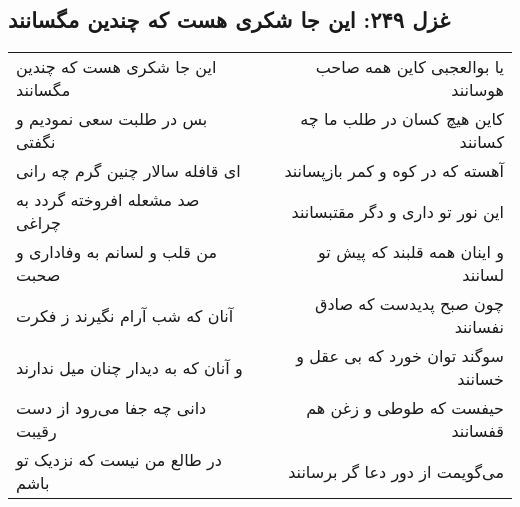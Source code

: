 \begin{center}
\section*{غزل ۲۴۹: این جا شکری هست که چندین مگسانند}
\label{sec:249}
\begin{longtable}{l p{0.5cm} r}
این جا شکری هست که چندین مگسانند
&&
یا بوالعجبی کاین همه صاحب هوسانند
\\
بس در طلبت سعی نمودیم و نگفتی
&&
کاین هیچ کسان در طلب ما چه کسانند
\\
ای قافله سالار چنین گرم چه رانی
&&
آهسته که در کوه و کمر بازپسانند
\\
صد مشعله افروخته گردد به چراغی
&&
این نور تو داری و دگر مقتبسانند
\\
من قلب و لسانم به وفاداری و صحبت
&&
و اینان همه قلبند که پیش تو لسانند
\\
آنان که شب آرام نگیرند ز فکرت
&&
چون صبح پدیدست که صادق نفسانند
\\
و آنان که به دیدار چنان میل ندارند
&&
سوگند توان خورد که بی عقل و خسانند
\\
دانی چه جفا می‌رود از دست رقیبت
&&
حیفست که طوطی و زغن هم قفسانند
\\
در طالع من نیست که نزدیک تو باشم
&&
می‌گویمت از دور دعا گر برسانند
\\
\end{longtable}
\end{center}

